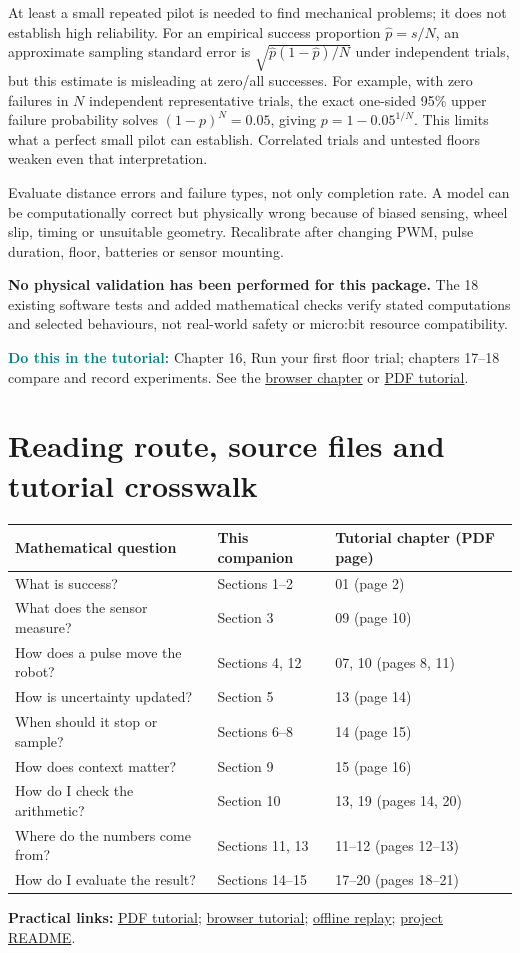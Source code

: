 \documentclass[11pt,a4paper]{article}
\newcommand{\tuto}[2]{\par\textcolor{teal}{\textbf{Do this in the tutorial:}} Chapter #1, #2. See the \href{Tutorial_A_to_Z.html\#t#1}{browser chapter} or \href{Tutorial_A_to_Z.pdf}{PDF tutorial}.\par}
\begin{document}
At least a small repeated pilot is needed to find mechanical problems; it does not establish high reliability. For an empirical success proportion $\hat p=s/N$, an approximate sampling standard error is $\sqrt{\hat p(1-\hat p)/N}$ under independent trials, but this estimate is misleading at zero/all successes. For example, with zero failures in $N$ independent representative trials, the exact one-sided 95\% upper failure probability solves $(1-p)^N=0.05$, giving $p=1-0.05^{1/N}$. This limits what a perfect small pilot can establish. Correlated trials and untested floors weaken even that interpretation.

Evaluate distance errors and failure types, not only completion rate. A model can be computationally correct but physically wrong because of biased sensing, wheel slip, timing or unsuitable geometry. Recalibrate after changing PWM, pulse duration, floor, batteries or sensor mounting.

\textbf{No physical validation has been performed for this package.} The 18 existing software tests and added mathematical checks verify stated computations and selected behaviours, not real-world safety or micro:bit resource compatibility.
\tuto{16}{Run your first floor trial; chapters 17--18 compare and record experiments}

\section{Reading route, source files and tutorial crosswalk}
\begin{longtable}{p{.35\linewidth}p{.22\linewidth}p{.31\linewidth}}
\toprule Mathematical question & This companion & Tutorial chapter (PDF page)\\\midrule\endhead
What is success? & Sections 1--2 & 01 (page 2)\\
What does the sensor measure? & Section 3 & 09 (page 10)\\
How does a pulse move the robot? & Sections 4, 12 & 07, 10 (pages 8, 11)\\
How is uncertainty updated? & Section 5 & 13 (page 14)\\
When should it stop or sample? & Sections 6--8 & 14 (page 15)\\
How does context matter? & Section 9 & 15 (page 16)\\
How do I check the arithmetic? & Section 10 & 13, 19 (pages 14, 20)\\
Where do the numbers come from? & Sections 11, 13 & 11--12 (pages 12--13)\\
How do I evaluate the result? & Sections 14--15 & 17--20 (pages 18--21)\\
\bottomrule
\end{longtable}
\textbf{Practical links:} \href{Tutorial_A_to_Z.pdf}{PDF tutorial}; \href{Tutorial_A_to_Z.html}{browser tutorial}; \href{index.html}{offline replay}; \href{README.md}{project README}.
\end{document}
